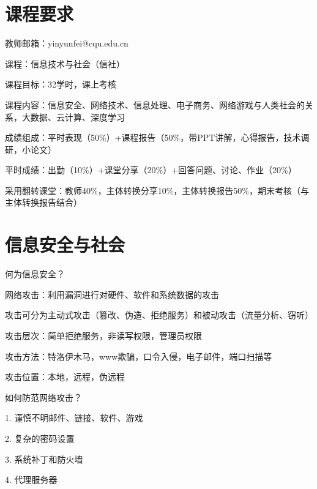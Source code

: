 \def\lecturer{尹云飞}
\def\noter{THF}
\def\className{Computer Science Technology and Society}
\def\term{III-B}



\maketitle
\tableofcontents
\section*{课程要求}%
\label{sec:课程要求}
教师邮箱：yinyunfei@cqu.edu.cn

课程：信息技术与社会（信社）

课程目标：32学时，课上考核

课程内容：信息安全、网络技术、信息处理、电子商务、网络游戏与人类社会的关系，大数据、云计算、深度学习

成绩组成：平时表现（50\%）+课程报告（50\%，带PPT讲解，心得报告，技术调研，小论文）

平时成绩：出勤（10\%）+课堂分享（20\%）+回答问题、讨论、作业（20\%）

采用翻转课堂：教师40\%，主体转换分享10\%，主体转换报告50\%，期末考核（与主体转换报告结合）

\section{信息安全与社会}%
\label{sec:信息安全与社会}
\begin{question}
    何为信息安全？
\end{question}
\begin{notation}
    网络攻击：利用漏洞进行对硬件、软件和系统数据的攻击
\end{notation}
攻击可分为主动式攻击（篡改、伪造、拒绝服务）和被动攻击（流量分析、窃听）

攻击层次：简单拒绝服务，非读写权限，管理员权限

攻击方法：特洛伊木马，www欺骗，口令入侵，电子邮件，端口扫描等

攻击位置：本地，远程，伪远程
\begin{question}
    如何防范网络攻击？
\end{question}
1. 谨慎不明邮件、链接、软件、游戏

2. 复杂的密码设置

3. 系统补丁和防火墙

4. 代理服务器

